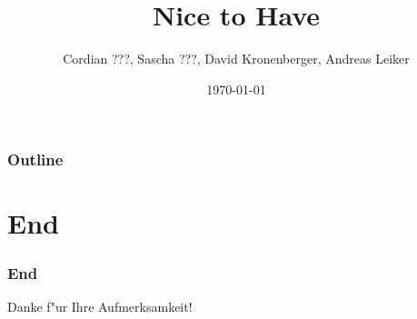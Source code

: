 \documentclass[envcountsect]{beamer}
\title{Nice to Have}
\author{Cordian ???, Sascha ???, David Kronenberger, Andreas Leiker}
\date{\today\vspace*{\fill}}
\begin{document}
\begin{frame}
\titlepage
\end{frame}

\begin{frame}
\frametitle{Outline}
\tableofcontents
\end{frame}






\section*{End}

\begin{frame}
\frametitle{End}

\begin{center}
Danke f"ur Ihre Aufmerksamkeit!
\end{center}
\end{frame}



\end{document}
